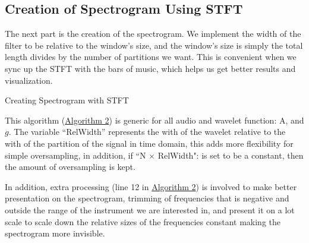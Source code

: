 \documentclass{article}
\begin{document}
    \subsection{Creation of Spectrogram Using STFT}
        \par\hspace{1.1em}
        The next part is the creation of the spectrogram. We implement the width of the filter to be relative to the window's size, and the window's size is simply the total length divides by the number of partitions we want. This is convenient when we sync up the STFT with the bars of music, which helps us get better results and visualization.
        \begin{algorithm}\label{alg:2}
            \begin{algorithmic}[1]
                \ENDFOR
            \end{algorithmic}\caption{Creating Spectrogram with STFT}
        \end{algorithm}
        \par
        This algorithm (\hyperref[alg:1]{Algorithm 2}) is generic for all audio and wavelet function: A, and $g$. The variable ``RelWidth'' represents the with of the wavelet relative to the with of the partition of the signal in time domain, this adds more flexibility for simple oversampling, in addition, if ``N $\times$ RelWidth": is set to be a constant, then the amount of oversampling is kept. 
        \par
        In addition, extra processing (line 12 in \hyperref[alg:2]{Algorithm 2}) is involved to make better presentation on the spectrogram, trimming of frequencies that is negative and outside the range of the instrument we are interested in, and present it on a lot scale to scale down the relative sizes of the frequencies constant making the spectrogram more invisible. 
\end{document}
